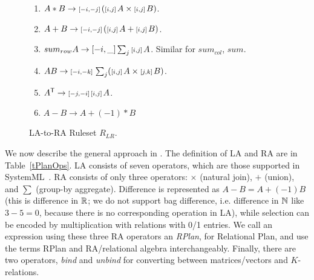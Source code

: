 \begin{figure}
\centering
\begin{enumerate}
\itemsep0em
  \item $A*B \rightarrow {\ensuremath{\scriptstyle\left[-i,-j\right]\,}}({\scriptstyle\left[i,j\right]\,}A \times {\ensuremath{\scriptstyle\left[i,j\right]\,}}B)$.
  \item $A+B \rightarrow {\ensuremath{\scriptstyle\left[-i,-j\right]\,}}({\scriptstyle\left[i,j\right]\,}A + {\scriptstyle\left[i,j\right]\,}B)$.
  \item $sum_{row} A \rightarrow [-i,\_ ] \sum_j {\scriptstyle\left[i,j\right]\,} A$. Similar for
    $sum_{col}$, $sum$.
  \item $AB \rightarrow {\ensuremath{\scriptstyle\left[-i,-k\right]\,}} \sum_j ({\scriptstyle\left[i,j\right]\,}A \times {\ensuremath{\scriptstyle\left[j,k\right]\,}}B)$.
  \item $A^{\mathsf{T}} \rightarrow {\ensuremath{\scriptstyle\left[-j,-i\right]\,}} {\ensuremath{\scriptstyle\left[i,j\right]\,}}A$.
  \item $A - B \rightarrow A + (-1) * B$
\end{enumerate}
\caption{LA-to-RA Ruleset $R_{LR}$.}
\vspace*{3pt}
\label{RMR}
\end{figure}


We now describe the general approach in \sys.  The definition
of LA and RA are in Table~\ref{tPlanOps}.  LA consists of seven
operators, which are those supported in
SystemML~\cite{DBLP:reference/bdt/Boehm19}.  RA consists of only three
operators: $\times$ (natural join), $+$ (union), and $\sum$ (group-by
aggregate).  Difference is represented as $A-B = A + (-1)B$ (this is
difference in $\mathbb R$; we do not support bag difference, i.e.  difference
in $\mathbb N$ like $3-5=0$, because there is no corresponding operation in
LA), while selection can be encoded by multiplication with relations
with 0/1 entries.  We call an expression using these three RA
operators an {\em RPlan}, for Relational Plan, and use the terms RPlan
and RA/relational algebra interchangeably.  Finally, there are two
operators, {\em bind} and {\em unbind} for converting between
matrices/vectors and $K$-relations.


